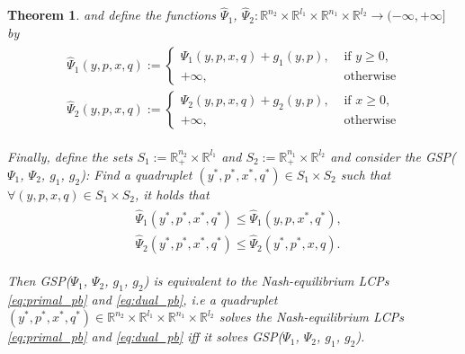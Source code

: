 \documentclass[a4paper,9pt]{extarticle}
\newtheorem{theorem}{Theorem}
\begin{document}
\begin{theorem}
and define the functions $\hat{\Psi}_1$, $\hat{\Psi}_2:
\mathbb{R}^{n_2} \times \mathbb{R}^{l_1} \times \mathbb{R}^{n_1}
\times \mathbb{R}^{l_2} \rightarrow (-\infty, +\infty]$ by
\begin{eqnarray}
  \begin{aligned}
    \hat{\Psi}_1(y, p, x, q) :=\begin{cases}
    \Psi_1(y, p, x, q)+ g_1(y, p), &\mbox{ if }y \ge 0,\\
    +\infty, &\mbox{ otherwise}\end{cases}\\
    \hat{\Psi}_2(y, p, x, q) :=\begin{cases}
    \Psi_2(y, p, x, q)+ g_2(y, p), &\mbox{ if }x \ge 0,\\
    +\infty, &\mbox{ otherwise}\end{cases}
  \end{aligned}
\end{eqnarray}

Finally, define the sets $S_1 := \mathbb{R}^{n_2}_+ \times \mathbb{R}^{l_1}$ and $S_2 :=
\mathbb{R}^{n_1}_+ \times \mathbb{R}^{l_2}$ and consider the
GSP($\Psi_1$, $\Psi_2$, $g_1$, $g_2$): Find a quadruplet $(y^*,p^*, x^*, q^*) \in
S_1 \times S_2$ such that $\forall (y,p, x, q) \in S_1
    \times S_2$, it holds that
\begin{eqnarray}
  \begin{split}
    &\hat{\Psi}_1(y^*, p^*, x^*, q^*) \le \hat{\Psi}_1(y, p, x^*,
    q^*),\\
    &\hat{\Psi}_2(y^*, p^*, x^*, q^*)
    \le \hat{\Psi}_2(y^*, p^*, x, q).
  \label{eq:unconstrained_pb}
\end{split}
\end{eqnarray}
\label{thm:pd}

Then GSP($\Psi_1$,
  $\Psi_2$, $g_1$, $g_2$) is equivalent to the Nash-equilibrium LCPs
  \eqref{eq:primal_pb} and \eqref{eq:dual_pb}, i.e
a quadruplet $(y^*,p^*, x^*, q^*) \in \mathbb{R}^{n_2}
  \times \mathbb{R}^{l_1} \times \mathbb{R}^{n_1} \times
  \mathbb{R}^{l_2}$ solves the Nash-equilibrium LCPs
  \eqref{eq:primal_pb} and \eqref{eq:dual_pb} iff it solves
  GSP($\Psi_1$, $\Psi_2$, $g_1$, $g_2$). 
  \label{thm:pd}
\end{theorem}
\end{document}
